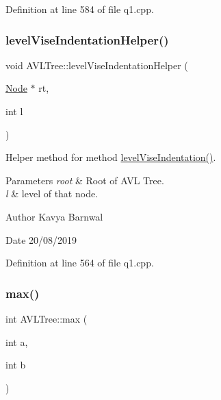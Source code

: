 Definition at line 584 of file q1.\+cpp.

\mbox{\label{class_a_v_l_tree_a4a917504798c964c12d6ea23bff6710c}} 
\subsubsection{\texorpdfstring{level\+Vise\+Indentation\+Helper()}{levelViseIndentationHelper()}}
{\footnotesize\ttfamily void A\+V\+L\+Tree\+::level\+Vise\+Indentation\+Helper (\begin{DoxyParamCaption}\item[{\hyperlink{class_node}{Node} $\ast$}]{rt,  }\item[{int}]{l }\end{DoxyParamCaption})\hspace{0.3cm}{\ttfamily [inline]}}

Helper method for method \hyperlink{class_a_v_l_tree_a4717d25b108d9ad8d67258c75e44f696}{level\+Vise\+Indentation()}. 
\begin{DoxyParams}{Parameters}
{\em root} & Root of A\+VL Tree. \\
\hline
{\em l} & level of that node. \\
\hline
\end{DoxyParams}
\begin{DoxyAuthor}{Author}
Kavya Barnwal 
\end{DoxyAuthor}
\begin{DoxyDate}{Date}
20/08/2019 
\end{DoxyDate}


Definition at line 564 of file q1.\+cpp.

\mbox{\label{class_a_v_l_tree_ae5cd885ee0ad8a06a933bdac473c3cc5}} 
\subsubsection{\texorpdfstring{max()}{max()}}
{\footnotesize\ttfamily int A\+V\+L\+Tree\+::max (\begin{DoxyParamCaption}\item[{int}]{a,  }\item[{int}]{b }\end{DoxyParamCaption})\hspace{0.3cm}{\ttfamily [inline]}}

